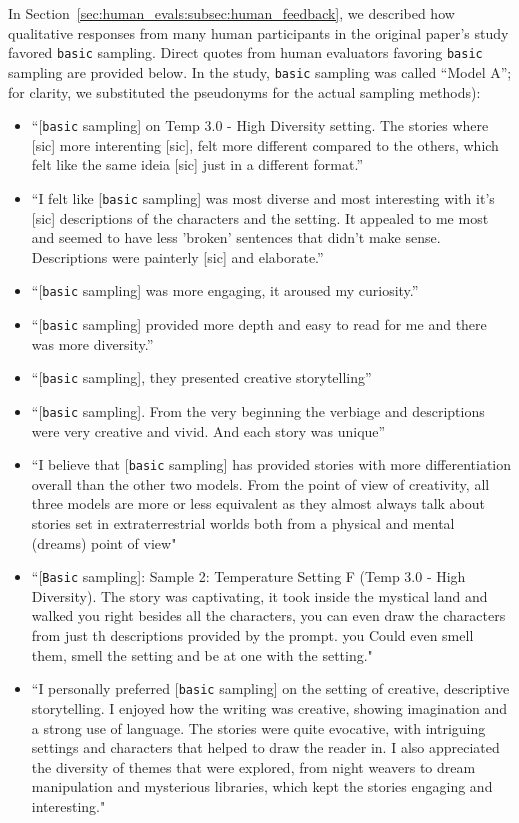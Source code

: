 In Section~\ref{sec:human_evals:subsec:human_feedback}, we described how qualitative responses from many human participants in the original paper's study favored \texttt{basic} sampling. Direct quotes from human evaluators favoring \texttt{basic} sampling are provided below. In the study, \texttt{basic} sampling was called “Model A”; for clarity, we substituted the pseudonyms for the actual sampling methods):
%
\begin{itemize}
    \item ``[\texttt{basic} sampling] on Temp 3.0 - High Diversity setting. The stories where [sic] more interenting [sic], felt more different compared to the others, which felt like the same ideia [sic] just in a different format.”
    \item ``I felt like [\texttt{basic} sampling] was most diverse and most interesting with it's [sic] descriptions of the characters and the setting. It appealed to me most and seemed to have less 'broken' sentences that didn't make sense. Descriptions were painterly [sic] and elaborate.”
    \item ``[\texttt{basic} sampling] was more engaging, it aroused my curiosity.”
    \item ``[\texttt{basic} sampling] provided more depth and easy to read for me and there was more diversity.”
    \item ``[\texttt{basic} sampling], they presented creative storytelling”
    \item ``[\texttt{basic} sampling]. From the very beginning the verbiage and descriptions were very creative and vivid. And each story was unique”
    \item ``I believe that [\texttt{basic} sampling] has provided stories with more differentiation overall than the other two models. From the point of view of creativity, all three models are more or less equivalent as they almost always talk about stories set in extraterrestrial worlds both from a physical and mental (dreams) point of view"
    \item ``[\texttt{Basic} sampling]: Sample 2: Temperature Setting F (Temp 3.0 - High Diversity). The story was captivating, it took inside the mystical land and walked you right besides all the characters, you can even draw the characters from just th descriptions provided by the prompt. you Could even smell them, smell the setting and be at one with the setting."
    \item ``I personally preferred [\texttt{basic} sampling] on the setting of creative, descriptive storytelling. I enjoyed how the writing was creative, showing imagination and a strong use of language. The stories were quite evocative, with intriguing settings and characters that helped to draw the reader in. I also appreciated the diversity of themes that were explored, from night weavers to dream manipulation and mysterious libraries, which kept the stories engaging and interesting."

\end{itemize}
